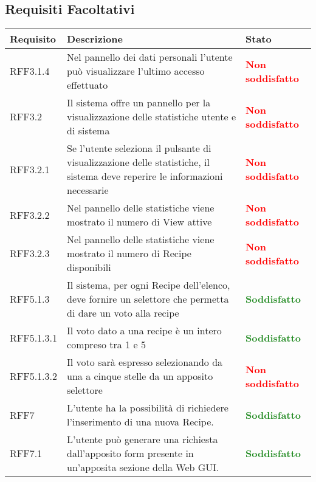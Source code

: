 \subsection{Requisiti Facoltativi}
\begin{center}

	\def\arraystretch{1.5}
	\bgroup
	\begin{longtable}{| p{2.5cm} | p{8cm} | p{3.5cm} |}

		\hline
		\textbf{Requisito} & \textbf{Descrizione} & \textbf{Stato} \\
		\hline
		RFF3.1.4  &  Nel pannello dei dati personali l'utente può visualizzare l'ultimo accesso effettuato  &  \textbf{\textcolor{red}{Non soddisfatto}} \\
		\hline
		RFF3.2  &  Il sistema offre un pannello per la visualizzazione delle statistiche utente e di sistema  &  \textbf{\textcolor{red}{Non soddisfatto}} \\
		\hline
		RFF3.2.1  &  Se l'utente seleziona il pulsante di visualizzazione delle statistiche, il sistema deve reperire le informazioni necessarie  &  \textbf{\textcolor{red}{Non soddisfatto}} \\
		\hline
		RFF3.2.2 &  Nel pannello delle statistiche viene mostrato il numero di View attive &  \textbf{\textcolor{red}{Non soddisfatto}} \\
		\hline
		RFF3.2.3  &  Nel pannello delle statistiche viene mostrato il numero di Recipe disponibili &  \textbf{\textcolor{red}{Non soddisfatto}} \\
		\hline
		RFF5.1.3  & Il sistema, per ogni Recipe dell'elenco, deve fornire un selettore che permetta di dare un voto alla recipe &  \textbf{\textcolor{forestgreen}{Soddisfatto}} \\
		\hline
		RFF5.1.3.1  & Il voto dato a una recipe è un intero compreso tra 1 e 5 &  \textbf{\textcolor{forestgreen}{Soddisfatto}} \\
		\hline
		RFF5.1.3.2  & Il voto sarà espresso selezionando da una a cinque stelle da un apposito selettore &  \textbf{\textcolor{red}{Non soddisfatto}} \\
		\hline
		RFF7  & L'utente ha la possibilità di richiedere l'inserimento di una nuova Recipe. & \textbf{\textcolor{forestgreen}{Soddisfatto}} \\
		\hline
		RFF7.1  & L'utente può generare una richiesta dall'apposito form presente in un'apposita sezione della Web GUI. & \textbf{\textcolor{forestgreen}{Soddisfatto}} \\

\end{longtable}
\end{center}

